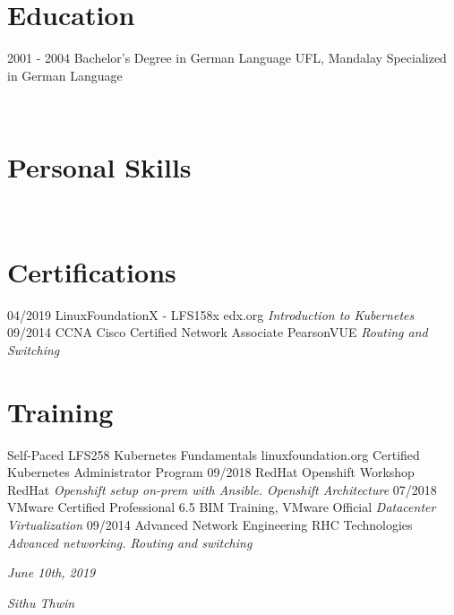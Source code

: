 \documentclass[]{friggeri-cv}
\begin{document}
\section{Education}
\begin{entrylist}
  \entry
    {2001 - 2004}
    {Bachelor's Degree in German Language}
    {UFL, Mandalay}
    {Specialized in German Language\\ }
\end{entrylist}
\newpage

\begin{aside}
~
~
~
  \section{Personal Skills}
	~
\end{aside}
\section{Certifications}
\begin{entrylist}
	\entry
	{04/2019}
	{LinuxFoundationX - LFS158x}
	{edx.org}
	{\emph{Introduction to Kubernetes}}
	\entry
	{09/2014}
	{CCNA Cisco Certified Network Associate}
	{PearsonVUE}
	{\emph{Routing and Switching}}
\end{entrylist}

\section{Training}
\begin{entrylist}
	\entry
	{Self-Paced}
	{LFS258 Kubernetes Fundamentals}
	{linuxfoundation.org}
	{Certified Kubernetes Administrator Program}
	\entry
	{09/2018}
	{RedHat Openshift Workshop}
	{RedHat}
	{\emph{Openshift setup on-prem with Ansible. Openshift Architecture}}	\entry
	{07/2018}
	{VMware Certified Professional 6.5}
	{BIM Training, VMware Official}
	{\emph{Datacenter Virtualization}}
	\entry
	{09/2014}
	{Advanced Network Engineering}
	{RHC Technologies}
	{\emph{Advanced networking. Routing and switching}}
\end{entrylist}

\begin{flushleft}
\emph{June 10th, 2019}
\end{flushleft}
\begin{flushright}
\emph{Sithu Thwin}
\end{flushright}
\end{document}
